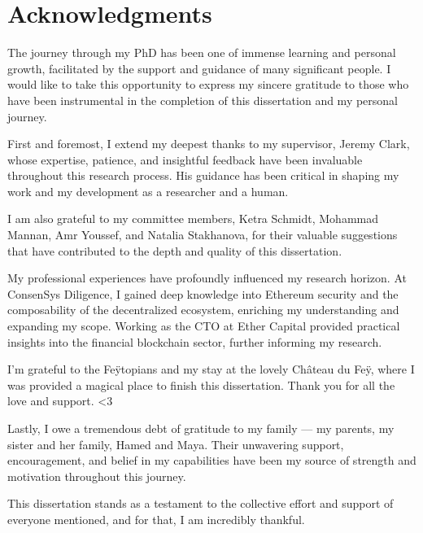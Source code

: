 
\chapter*{Acknowledgments}

The journey through my PhD has been one of immense learning and personal growth, facilitated by the support and guidance of many significant people. I would like to take this opportunity to express my sincere gratitude to those who have been instrumental in the completion of this dissertation and my personal journey.
 \vspace{0.5cm} 

First and foremost, I extend my deepest thanks to my supervisor, Jeremy Clark, whose expertise, patience, and insightful feedback have been invaluable throughout this research process. His guidance has been critical in shaping my work and my development as a researcher and a human. 
 \vspace{0.5cm} 

I am also grateful to my committee members, Ketra Schmidt, Mohammad Mannan, Amr Youssef, and Natalia Stakhanova, for their valuable suggestions that have contributed to the depth and quality of this dissertation. %
 \vspace{0.5cm} 

My professional experiences have profoundly influenced my research horizon. At ConsenSys Diligence, I gained deep knowledge into Ethereum security and the composability of the decentralized ecosystem, enriching my understanding and expanding my scope. Working as the CTO at Ether Capital provided practical insights into the financial blockchain sector, further informing my research. 
 \vspace{0.5cm} 

I'm grateful to the Fe\"ytopians and my stay at the lovely Ch\^ateau du Fe\"y, where I was provided a magical place to finish this dissertation. Thank you for all the love and support. \textless3 
 \vspace{0.5cm} 

Lastly, I owe a tremendous debt of gratitude to my family — my parents, my sister and her family, Hamed and Maya. Their unwavering support, encouragement, and belief in my capabilities have been my source of strength and motivation throughout this journey.
 \vspace{0.5cm} 

This dissertation stands as a testament to the collective effort and support of everyone mentioned, and for that, I am incredibly thankful.



